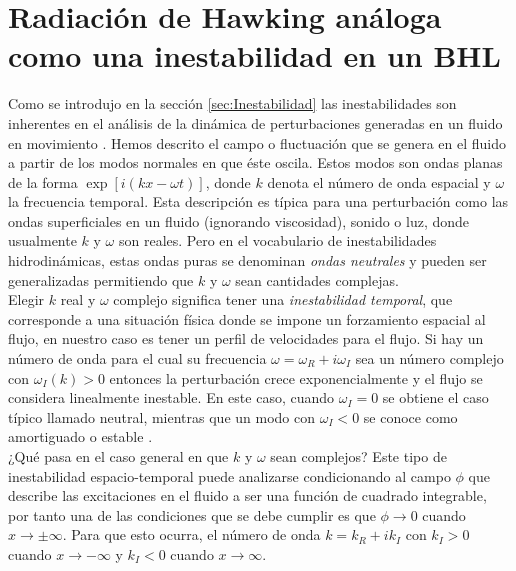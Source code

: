 \chapter[Inestabilidades en un BHL]{Radiaci\'{o}n de Hawking an\'{a}loga como una inestabilidad en un BHL}\label{cap3}

Como se introdujo en la secci\'{o}n \ref{sec:Inestabilidad} las inestabilidades son inherentes en el an\'{a}lisis de la din\'{a}mica de perturbaciones generadas en un fluido en movimiento \citep{Hydrodynamic}. Hemos descrito el campo o fluctuaci\'{o}n que se genera en el fluido a partir de los modos normales en que \'{e}ste oscila. Estos modos son ondas planas de la forma $\exp[i(kx-\omega t)]$, donde $k$ denota el número de onda espacial y $\omega$ la frecuencia temporal. Esta descripci\'{o}n es t\'{i}pica para una perturbaci\'{o}n como las ondas superficiales en un fluido (ignorando viscosidad), sonido o luz, donde usualmente $k$ y $\omega$ son reales. Pero en el vocabulario de inestabilidades hidrodinámicas, estas ondas puras se denominan \textit{ondas neutrales} y pueden ser generalizadas permitiendo que $k$ y $\omega$ sean cantidades complejas.\\

Elegir $k$ real y $\omega$ complejo significa tener una \textit{inestabilidad temporal}, que corresponde a una situación física donde se impone un forzamiento espacial al flujo, en nuestro caso es tener un perfil de velocidades para el flujo. Si hay un número de onda para el cual su frecuencia $\omega=\omega_R+i\omega_I$ sea un n\'{u}mero complejo con $\omega_I(k)>0$  entonces la perturbación crece exponencialmente y el flujo se considera linealmente inestable. En este caso, cuando $\omega_I=0$ se obtiene el caso t\'{i}pico	llamado neutral, mientras que un modo con $\omega_I<0$ se conoce como amortiguado o estable \citep{gallaire2017fluid}.\\

¿Qu\'{e} pasa en el caso general en que $k$ y $\omega$ sean complejos? Este tipo de inestabilidad espacio-temporal puede analizarse condicionando al campo $\phi$ que describe las excitaciones en el fluido a ser una funci\'{o}n de cuadrado integrable, por tanto una de las condiciones que se debe cumplir es que $\phi\rightarrow 0$ cuando $x\longrightarrow \pm \infty$. Para que esto ocurra, el n\'{u}mero de onda $k=k_R+ik_I$ con $k_I>0$ cuando $x \rightarrow -\infty$ y $k_I<0$ cuando $x \rightarrow \infty$.\\

